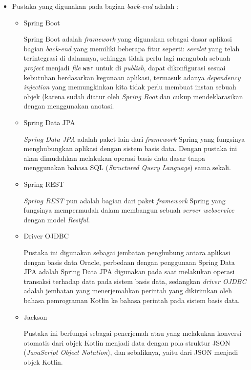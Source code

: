 \documentclass[pdftex,12pt, oneside]{article}
\begin{document}
\begin{itemize}
\begin{itemize}
			\item Pustaka yang digunakan pada bagian \textit{back-end} adalah :
			
			\begin{itemize}
				\item Spring Boot
				
Spring Boot adalah \textit{framework} yang digunakan sebagai dasar aplikasi bagian \textit{back-end} yang memiliki beberapa fitur seperti: \textit{servlet} yang telah terintegrasi di dalamnya, sehingga tidak perlu lagi mengubah sebuah \textit{project} menjadi \textit{file} \texttt{war} untuk di \textit{publish}, dapat dikonfigurasi sesuai kebutuhan berdasarkan kegunaan aplikasi, termasuk adanya \textit{dependency injection} yang memungkinkan kita tidak perlu membuat instan sebuah objek (karena sudah diatur oleh \textit{Spring Boot} dan cukup mendeklarasikan dengan menggunakan anotasi.				
				
				\item Spring Data JPA
				
\textit{Spring Data JPA} adalah paket lain dari \textit{framework} Spring yang fungsinya menghubungkan aplikasi dengan sistem basis data. Dengan pustaka ini akan dimudahkan melakukan operasi basis data dasar tanpa menggunakan bahasa SQL (\textit{Structured Query Language}) sama sekali.				
				
				\item Spring REST
				
\textit{Spring REST} pun adalah bagian dari paket \textit{framework} Spring yang fungsinya mempermudah dalam membangun sebuah \textit{server webservice} dengan model \textit{Restful}.				
				
				\item Driver OJDBC
				
Pustaka ini digunakan sebagai jembatan penghubung antara aplikasi dengan basis data Oracle, perbedaan dengan penggunaan Spring Data JPA adalah Spring Data JPA digunakan pada saat melakukan operasi transaksi terhadap data pada sistem basis data, sedangkan \textit{driver OJDBC} adalah jembatan yang menerjemahkan perintah yang dikirimkan oleh bahasa pemrograman Kotlin ke bahasa perintah pada sistem basis data.				
				
				\item Jackson
				
Pustaka ini berfungsi sebagai penerjemah atau yang melakukan konversi otomatis dari objek Kotlin menjadi data dengan pola struktur JSON (\textit{JavaScript Object Notation}), dan sebaliknya, yaitu dari JSON menjadi objek Kotlin.		
				
			\end{itemize}
		\end{itemize}	
	
\end{itemize}
\end{document}
